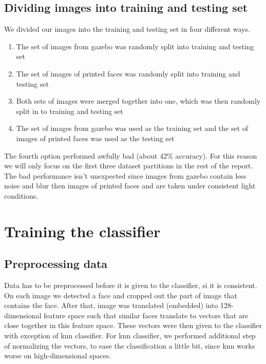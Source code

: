 \documentclass[12pt,a4paper]{article}
\begin{document}
    \subsection{Dividing images into training and testing set}

    We divided our images into the training and testing set in four different ways.

    \begin{enumerate} %
		\item The set of images from gazebo was randomly split into training and testing set 
		\item The set of images of printed faces was randomly split into training and testing set
		\item Both sets of images were merged together into one, which was then randomly split in to training and testing set
		\item The set of images from gazebo was used as the training set and the set of images of printed faces was used as the testing set
    \end{enumerate}
    
    The fourth option performed awfully bad (about 42\% accuracy). For this reason we will only focus on the first three dataset partitions in the rest of the report. The bad performance isn't unexpected since images from gazebo contain less noise and blur then images of printed faces and are taken under consistent light conditions.

    \section{Training the classifier}

    \subsection{Preprocessing data}

    Data has to be preprocessed before it is given to the classifier, si it is consistent. On each image we detected a face and cropped out the part of image that contains the face. After that, image was translated (embedded) into 128-dimensional feature space such that similar faces translate to vectors that are close together in this feature space. These vectors were then given to the classifier with exception of knn classifier. For knn classifier, we performed additional step of normalizing the vectors, to ease the classification a little bit, since knn works worse on high-dimensional spaces.
\end{document}
